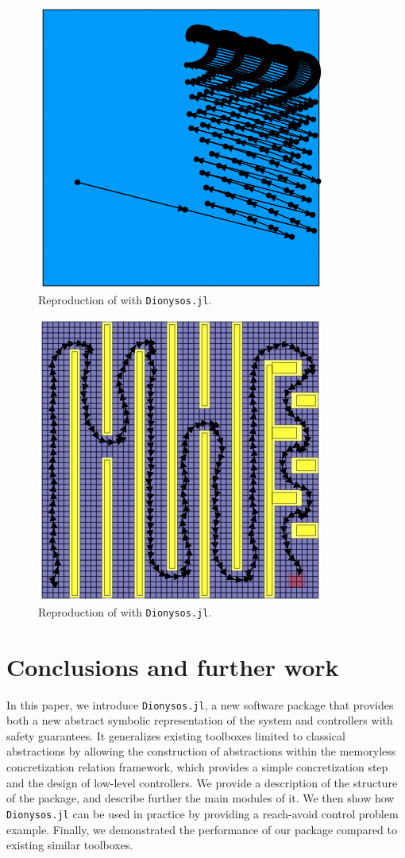 \documentclass{juliacon}
\begin{document}
\begin{figure}[ht!]
    \centerline{\includegraphics[width=0.6\linewidth]{Figures/Benchmarking/dcdc.png}}
    \caption{Reproduction of \cite[Figure 4]{rungger2016scots} with \texttt{Dionysos.jl}.}
    \label{fig:dcdc}
\end{figure}
\begin{figure}[ht!]
    \centerline{\includegraphics[width=0.6\linewidth]{Figures/Benchmarking/vehicle.png}}
    \caption{Reproduction of \cite[Figure 3]{rungger2016scots} with \texttt{Dionysos.jl}.}
    \label{fig:vehicle}
\end{figure}
 
\section{Conclusions and further work}

In this paper, we introduce \texttt{Dionysos.jl}, a new software package that provides both a new abstract symbolic representation of the system and controllers with safety guarantees. It generalizes existing toolboxes limited to classical abstractions by allowing the construction of abstractions within the memoryless concretization relation framework, which provides a simple concretization step and the design of low-level controllers.
%
We provide a description of the structure of the package, and describe further the main modules of it. We then show how \texttt{Dionysos.jl} can be used in practice by providing a reach-avoid control problem example. Finally, we demonstrated the performance of our package compared to existing similar toolboxes.
\end{document}
